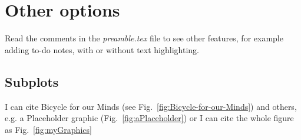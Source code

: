 \section{Other options}

Read the comments in the \textit{preamble.tex} file to see other features, for example adding to-do notes, with or without text highlighting.

\begin{landscape}

\section*{Subplots}
I can cite Bicycle for our Minds (see Fig.~\ref{fig:Bicycle-for-our-Minds}) and others, e.g. a Placeholder graphic (Fig.~\ref{fig:aPlaceholder}) or I can cite the whole figure as Fig.~\ref{fig:myGraphics}


\end{landscape}
